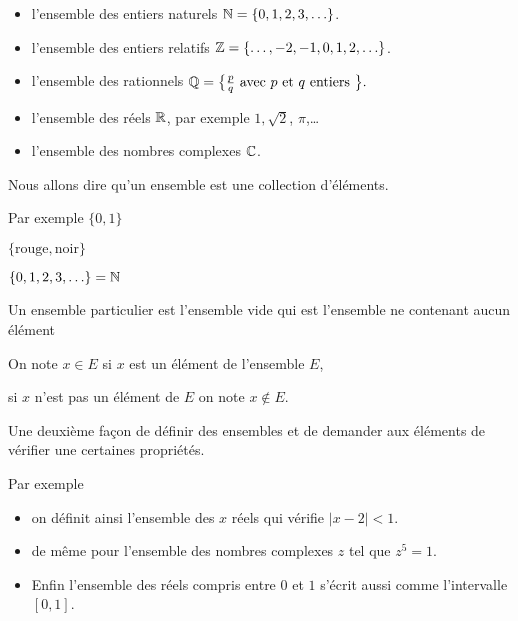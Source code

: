 \begin{itemize}
  \item l'ensemble des entiers naturels $\mathbb{N} =\{0,1,2,3,\ldots\}$. 

\change
 
  \item l'ensemble des entiers relatifs $\mathbb{Z} = \{\ldots, -2,-1,0,1,2,\ldots\}$.

\change

  \item l'ensemble des rationnels $\mathbb{Q} = \big\{ \frac{p}{q} \text{ avec $p$ et $q$ entiers } \big\}.$

\change

  \item l'ensemble des réels $\mathbb{R}$, par exemple $1, \sqrt 2$, $\pi$,\ldots

\change

  \item l'ensemble des nombres complexes $\mathbb{C}$.
\end{itemize}



\diapo

Nous allons dire qu'un ensemble est une collection d'éléments.

\change

Par exemple $\{ 0, 1 \}$ 


$\{ \text{rouge}, \text{noir} \}$ 


$\{0, 1, 2, 3,\ldots\} = \mathbb{N}$

\change

Un ensemble particulier est l'ensemble vide qui est l'ensemble ne contenant aucun élément

\change

On note $x \in E$ si $x$ est un élément de l'ensemble $E$,

si $x$ n'est pas un élément de $E$ on note $x\notin E$.

\change

Une deuxième façon de définir des ensembles et de demander 
aux éléments de vérifier une certaines propriétés.

\change

Par exemple  

\begin{itemize}
     \item on définit ainsi l'ensemble des $x$ réels qui vérifie $|x-2| < 1$.
     \item de même pour l'ensemble des nombres complexes $z$ tel que $z^5=1$.
     \item Enfin l'ensemble des réels compris entre $0$ et $1$ s'écrit aussi comme l'intervalle $[0,1]$.
 \end{itemize}


